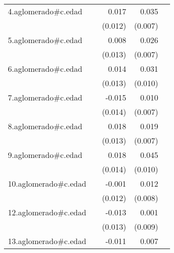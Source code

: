 {\begin{longtable}{l*{4}{D{.}{.}{-1}}}
\addlinespace
4.aglomerado#c.edad&                     &       0.017         &       0.035\sym{***}&                     \\
            &                     &     (0.012)         &     (0.007)         &                     \\
\addlinespace
5.aglomerado#c.edad&                     &       0.008         &       0.026\sym{***}&                     \\
            &                     &     (0.013)         &     (0.007)         &                     \\
\addlinespace
6.aglomerado#c.edad&                     &       0.014         &       0.031\sym{**} &                     \\
            &                     &     (0.013)         &     (0.010)         &                     \\
\addlinespace
7.aglomerado#c.edad&                     &      -0.015         &       0.010         &                     \\
            &                     &     (0.014)         &     (0.007)         &                     \\
\addlinespace
8.aglomerado#c.edad&                     &       0.018         &       0.019\sym{**} &                     \\
            &                     &     (0.013)         &     (0.007)         &                     \\
\addlinespace
9.aglomerado#c.edad&                     &       0.018         &       0.045\sym{***}&                     \\
            &                     &     (0.014)         &     (0.010)         &                     \\
\addlinespace
10.aglomerado#c.edad&                     &      -0.001         &       0.012         &                     \\
            &                     &     (0.012)         &     (0.008)         &                     \\
\addlinespace
12.aglomerado#c.edad&                     &      -0.013         &       0.001         &                     \\
            &                     &     (0.013)         &     (0.009)         &                     \\
\addlinespace
13.aglomerado#c.edad&                     &      -0.011         &       0.007         &                     \\

\end{longtable}}
